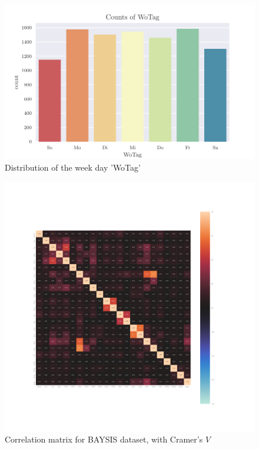 \documentclass[a4paper,headsepline,footsepline,fontsize=11pt,BCOR=12mm,DIV=12]{report}
\begin{document}
\begin{appendices}
\begin{figure}[h]
	\centering
	\includegraphics[scale=1]{../CorrAnalysis/data/BAYSIS/01_dataset/plots/baysis_dataset_count_WoTag}
	\caption{Distribution of the week day 'WoTag'}
	\label{img:appendix_baysis_dataset_WoTag}
\end{figure}

\begin{figure}[h]
	\centering
	\includegraphics[scale=0.35, trim=2cm 6cm 0cm 6cm]{../CorrAnalysis/data/BAYSIS/01_dataset/plots/baysis_dataset_corr_cramers}
	\caption{Correlation matrix for BAYSIS dataset, with Cramer's $V$}
	\label{img:appendix_correlation_matrix_dataset_cramers}
\end{figure}
\restoregeometry


\end{appendices}
\end{document}
